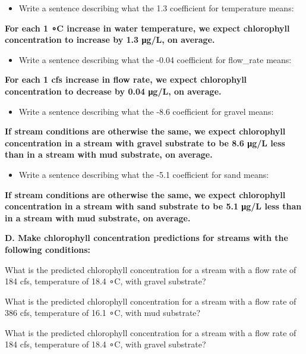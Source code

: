 \documentclass[
]{article}
\providecommand{\tightlist}{%
  \setlength{\itemsep}{0pt}\setlength{\parskip}{0pt}}
\begin{document}
\begin{itemize}
\tightlist
\item
  Write a sentence describing what the 1.3 coefficient for temperature
  means:
\end{itemize}

\textbf{For each 1 ∘C increase in water temperature, we expect
chlorophyll concentration to increase by 1.3 μg/L, on average.}

\begin{itemize}
\tightlist
\item
  Write a sentence describing what the -0.04 coefficient for flow\_rate
  means:
\end{itemize}

\textbf{For each 1 cfs increase in flow rate, we expect chlorophyll
concentration to decrease by 0.04 μg/L, on average.}

\begin{itemize}
\tightlist
\item
  Write a sentence describing what the -8.6 coefficient for gravel
  means:
\end{itemize}

\textbf{If stream conditions are otherwise the same, we expect
chlorophyll concentration in a stream with gravel substrate to be 8.6
μg/L less than in a stream with mud substrate, on average.}

\begin{itemize}
\tightlist
\item
  Write a sentence describing what the -5.1 coefficient for sand means:
\end{itemize}

\textbf{If stream conditions are otherwise the same, we expect
chlorophyll concentration in a stream with sand substrate to be 5.1 μg/L
less than in a stream with mud substrate, on average.}

\textbf{D. Make chlorophyll concentration predictions for streams with
the following conditions:}

What is the predicted chlorophyll concentration for a stream with a flow
rate of 184 cfs, temperature of 18.4 ∘C, with gravel substrate?

What is the predicted chlorophyll concentration for a stream with a flow
rate of 386 cfs, temperature of 16.1 ∘C, with mud substrate?

What is the predicted chlorophyll concentration for a stream with a flow
rate of 184 cfs, temperature of 18.4 ∘C, with gravel substrate?
\end{document}
